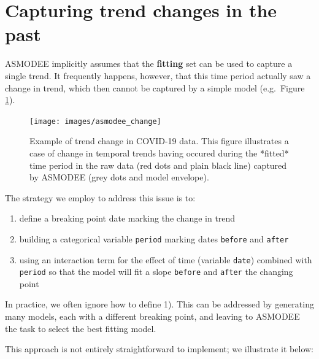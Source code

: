 \documentclass[]{book}
\providecommand{\tightlist}{%
  \setlength{\itemsep}{0pt}\setlength{\parskip}{0pt}}
\begin{document}
\hypertarget{capturing-trend-changes-in-the-past}{%
\section{Capturing trend changes in the past}\label{capturing-trend-changes-in-the-past}}

ASMODEE implicitly assumes that the \textbf{fitting} set can be used to capture a
single trend. It frequently happens, however, that this time period actually saw
a change in trend, which then cannot be captured by a simple model (e.g.~Figure
\ref{fig:asmodee-change}).

\begin{figure}

{\centering \texttt{[image: images/asmodee\_change]} 

}

\caption{Example of trend change in COVID-19 data. This figure illustrates a case of change in temporal trends having occured during the *fitted* time period in the raw data (red dots and plain black line) captured by ASMODEE (grey dots and model envelope).}\label{fig:asmodee-change}
\end{figure}

The strategy we employ to address this issue is to:

\begin{enumerate}
\def\labelenumi{\arabic{enumi}.}
\tightlist
\item
  define a breaking point date marking the change in trend
\item
  building a categorical variable \texttt{period} marking dates \texttt{before} and \texttt{after}
\item
  using an interaction term for the effect of time (variable \texttt{date}) combined
  with \texttt{period} so that the model will fit a slope \texttt{before} and \texttt{after} the
  changing point
\end{enumerate}

In practice, we often ignore how to define 1). This can be addressed by
generating many models, each with a different breaking point, and leaving to
ASMODEE the task to select the best fitting model.

This approach is not entirely straightforward to implement; we illustrate it
below:
\end{document}
